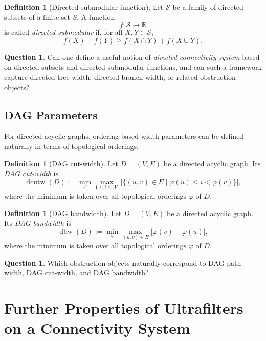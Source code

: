 \documentclass[10pt]{book}
\theoremstyle{definition}
\newtheorem{definition}[theorem]{Definition}
\newtheorem{question}[theorem]{Question}
\begin{document}
\begin{definition}[Directed submodular function]\cite{Qi1988DirectedSD}
Let \(\mathcal{S}\) be a family of directed subsets of a finite set \(S\).
A function
\[
f:\mathcal{S}\to\mathbb{R}
\]
is called \emph{directed submodular} if, for all \(X,Y\in\mathcal{S}\),
\[
f(X)+f(Y)\ge f(X\cap Y)+f(X\cup Y).
\]
\end{definition}

\begin{question}
Can one define a useful notion of \emph{directed connectivity system} based on directed subsets and directed submodular functions, and can such a framework capture directed tree-width, directed branch-width, or related obstruction objects?
\end{question}

\subsection{DAG Parameters}

For directed acyclic graphs, ordering-based width parameters can be defined naturally in terms of topological orderings.

\begin{definition}[DAG cut-width]
Let \(D=(V,E)\) be a directed acyclic graph.
Its \emph{DAG cut-width} is
\[
\operatorname{dcutw}(D):=
\min_{\varphi}
\max_{1\le i\le |V|}
\left|
\{(u,v)\in E \mid \varphi(u)\le i<\varphi(v)\}
\right|,
\]
where the minimum is taken over all topological orderings \(\varphi\) of \(D\).
\end{definition}

\begin{definition}[DAG bandwidth]
Let \(D=(V,E)\) be a directed acyclic graph.
Its \emph{DAG bandwidth} is
\[
\operatorname{dbw}(D):=
\min_{\varphi}
\max_{(u,v)\in E} |\varphi(v)-\varphi(u)|,
\]
where the minimum is taken over all topological orderings \(\varphi\) of \(D\).
\end{definition}

\begin{question}
Which obstruction objects naturally correspond to DAG-path-width, DAG cut-width, and DAG bandwidth?
\end{question}


\section{Further Properties of Ultrafilters on a Connectivity System}
\end{document}
